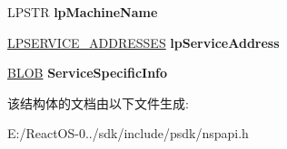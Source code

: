 \begin{DoxyCompactItemize}
L\+P\+S\+TR {\bfseries lp\+Machine\+Name}
\item 
\mbox{\label{struct___s_e_r_v_i_c_e___i_n_f_o_a_acf4e213f77475e887943f47fe80f4119}} 
\hyperlink{struct___s_e_r_v_i_c_e___a_d_d_r_e_s_s_e_s}{L\+P\+S\+E\+R\+V\+I\+C\+E\+\_\+\+A\+D\+D\+R\+E\+S\+S\+ES} {\bfseries lp\+Service\+Address}
\item 
\mbox{\label{struct___s_e_r_v_i_c_e___i_n_f_o_a_a86548293aa4290dbb51bc252ba200f87}} 
\hyperlink{struct___b_l_o_b}{B\+L\+OB} {\bfseries Service\+Specific\+Info}
\end{DoxyCompactItemize}


该结构体的文档由以下文件生成\+:\begin{DoxyCompactItemize}
\item 
E\+:/\+React\+O\+S-\/0../sdk/include/psdk/nspapi.\+h\end{DoxyCompactItemize}
